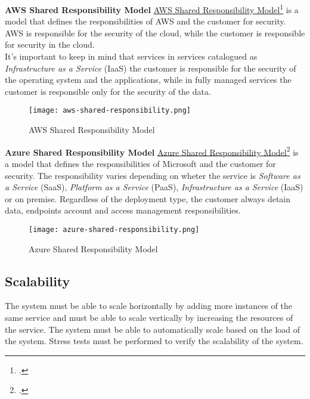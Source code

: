     \newpage
    \textbf{AWS Shared Responsibility Model}
    \href{https://aws.amazon.com/it/compliance/shared-responsibility-model/}{AWS Shared Responsibility Model}\footcite{site:aws-shared-responsibility-model} is a model that defines the responsibilities of AWS and the customer for security. AWS is responsible for the security of the cloud, while the customer is responsible for security in the cloud.\\
    It's important to keep in mind that services in services catalogued as \textit{Infrastructure as a Service} (IaaS) the customer is responsible for the security of the operating system and the applications, while in fully managed services the customer is responsible only for the security of the data.\\
    \begin{figure}[htbp]
        \centering
        \texttt{[image: aws-shared-responsibility.png]}
        \caption{AWS Shared Responsibility Model}
    \end{figure}

    \newpage
    \textbf{Azure Shared Responsibility Model}
    \href{https://learn.microsoft.com/en-us/azure/security/fundamentals/shared-responsibility}{Azure Shared Responsibility Model}\footcite{site:azure-shared-responsibility-model} is a model that defines the responsibilities of Microsoft and the customer for security. The responsibility varies depending on wheter the service is \textit{Software as a Service} (SaaS), \textit{Platform as a Service} (PaaS), \textit{Infrastructure as a Service} (IaaS) or on premise. Regardless of the deployment type, the customer always detain data, endpoints account and access management responsibilities.\\
    
    \begin{figure}[htbp]
        \centering
        \texttt{[image: azure-shared-responsibility.png]}
        \caption{Azure Shared Responsibility Model}
    \end{figure}

\subsection{Scalability}
The system must be able to scale horizontally by adding more instances of the same service and must be able to scale vertically by increasing the resources of the service. The system must be able to automatically scale based on the load of the system.
Stress tests must be performed to verify the scalability of the system.\\

